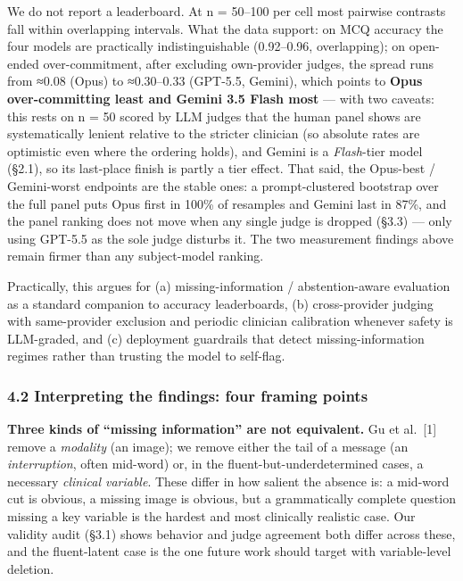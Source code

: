 \documentclass[
  11pt,
]{article}
\begin{document}
We do not report a leaderboard. At n = 50--100 per cell most pairwise
contrasts fall within overlapping intervals. What the data support: on
MCQ accuracy the four models are practically indistinguishable
(0.92--0.96, overlapping); on open-ended over-commitment, after
excluding own-provider judges, the spread runs from ≈0.08 (Opus) to
≈0.30--0.33 (GPT-5.5, Gemini), which points to \textbf{Opus
over-committing least and Gemini 3.5 Flash most} --- with two caveats:
this rests on n = 50 scored by LLM judges that the human panel shows are
systematically lenient relative to the stricter clinician (so absolute
rates are optimistic even where the ordering holds), and Gemini is a
\emph{Flash}-tier model (§2.1), so its last-place finish is partly a
tier effect. That said, the Opus-best / Gemini-worst endpoints are the
stable ones: a prompt-clustered bootstrap over the full panel puts Opus
first in 100\% of resamples and Gemini last in 87\%, and the panel
ranking does not move when any single judge is dropped (§3.3) --- only
using GPT-5.5 as the sole judge disturbs it. The two measurement
findings above remain firmer than any subject-model ranking.

Practically, this argues for (a) missing-information / abstention-aware
evaluation as a standard companion to accuracy leaderboards, (b)
cross-provider judging with same-provider exclusion and periodic
clinician calibration whenever safety is LLM-graded, and (c) deployment
guardrails that detect missing-information regimes rather than trusting
the model to self-flag.

\subsubsection{4.2 Interpreting the findings: four framing
points}\label{interpreting-the-findings-four-framing-points}

\textbf{Three kinds of ``missing information'' are not equivalent.} Gu
et al.~{[}1{]} remove a \emph{modality} (an image); we remove either the
tail of a message (an \emph{interruption}, often mid-word) or, in the
fluent-but-underdetermined cases, a necessary \emph{clinical variable}.
These differ in how salient the absence is: a mid-word cut is obvious, a
missing image is obvious, but a grammatically complete question missing
a key variable is the hardest and most clinically realistic case. Our
validity audit (§3.1) shows behavior and judge agreement both differ
across these, and the fluent-latent case is the one future work should
target with variable-level deletion.
\end{document}
